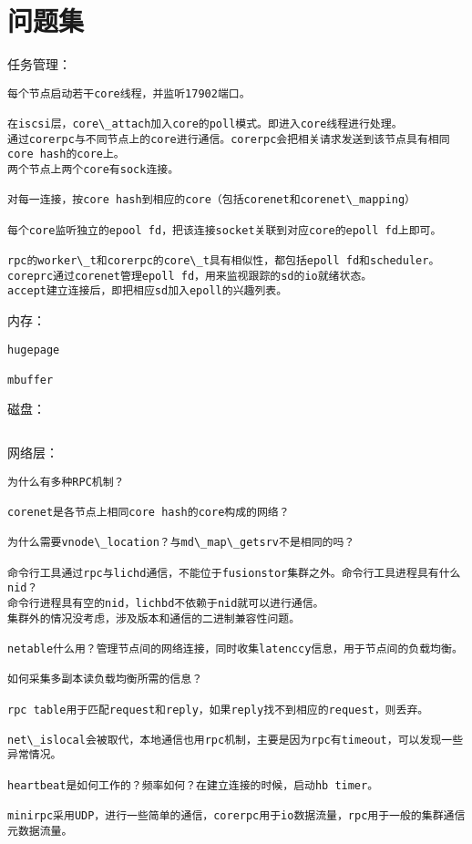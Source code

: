\chapter{问题集}

任务管理：
\begin{lstlisting}
每个节点启动若干core线程，并监听17902端口。

在iscsi层，core\_attach加入core的poll模式。即进入core线程进行处理。
通过corerpc与不同节点上的core进行通信。corerpc会把相关请求发送到该节点具有相同core hash的core上。
两个节点上两个core有sock连接。

对每一连接，按core hash到相应的core（包括corenet和corenet\_mapping）

每个core监听独立的epool fd，把该连接socket关联到对应core的epoll fd上即可。

rpc的worker\_t和corerpc的core\_t具有相似性，都包括epoll fd和scheduler。
coreprc通过corenet管理epoll fd，用来监视跟踪的sd的io就绪状态。
accept建立连接后，即把相应sd加入epoll的兴趣列表。
\end{lstlisting}

内存：
\begin{lstlisting}
hugepage

mbuffer
\end{lstlisting}

磁盘：
\begin{lstlisting}
\end{lstlisting}

网络层：
\begin{lstlisting}
为什么有多种RPC机制？

corenet是各节点上相同core hash的core构成的网络？

为什么需要vnode\_location？与md\_map\_getsrv不是相同的吗？

命令行工具通过rpc与lichd通信，不能位于fusionstor集群之外。命令行工具进程具有什么nid？
命令行进程具有空的nid，lichbd不依赖于nid就可以进行通信。
集群外的情况没考虑，涉及版本和通信的二进制兼容性问题。

netable什么用？管理节点间的网络连接，同时收集latenccy信息，用于节点间的负载均衡。

如何采集多副本读负载均衡所需的信息？

rpc table用于匹配request和reply，如果reply找不到相应的request，则丢弃。

net\_islocal会被取代，本地通信也用rpc机制，主要是因为rpc有timeout，可以发现一些异常情况。

heartbeat是如何工作的？频率如何？在建立连接的时候，启动hb timer。

minirpc采用UDP，进行一些简单的通信，corerpc用于io数据流量，rpc用于一般的集群通信元数据流量。

\end{lstlisting}


